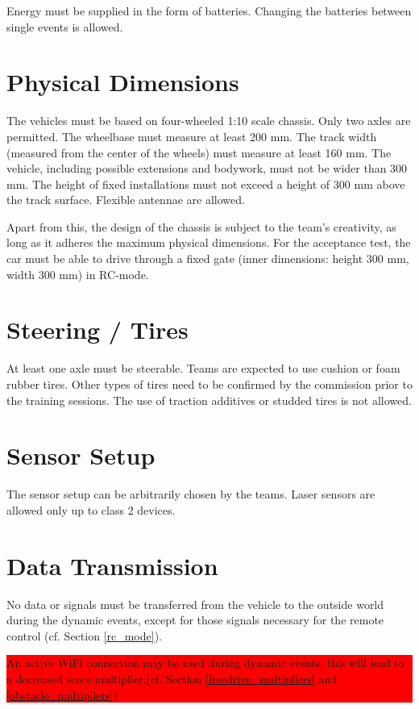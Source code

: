 \documentclass[a4paper]{report}
\newlength\colorboxwidth
\begin{document}
Energy must be supplied in the form of batteries. Changing the batteries between single events is allowed. 

\section{Physical Dimensions}

The vehicles must be based on four-wheeled 1:10 scale chassis. Only two axles are permitted. The wheelbase must measure at least 200 mm. The track width (measured from the center of the wheels) must measure at least 160 mm. The vehicle, including possible extensions and bodywork, must not be wider than 300 mm. The height of fixed installations must not exceed a height of 300 mm above the track surface. Flexible antennae are allowed.

Apart from this, the design of the chassis is subject to the team’s creativity, as long as it adheres the maximum physical dimensions. For the acceptance test, the car must be able to drive through a fixed gate (inner dimensions: height 300 mm, width 300 mm) in RC-mode. 

\section{Steering / Tires}

At least one axle must be steerable. Teams are expected to use cushion or foam rubber tires. Other types of tires need to be confirmed by the commission prior to the training sessions. The use of traction additives or studded tires is not allowed. 

\section{Sensor Setup}

The sensor setup can be arbitrarily chosen by the teams. Laser sensors are allowed only up to class 2 devices. 

\section{Data Transmission}

No data or signals must be transferred from the vehicle to the outside world during the dynamic events, except for those signals necessary for the remote control (cf. Section \ref{rc_mode}).\\
\colorbox{red}{\parbox{\colorboxwidth}{An active WiFi connection may be used during dynamic events, this will lead to a decreased score multiplier.(cf. Section \ref{freedrive_multipliers} and \ref{obstacle_multipliers})}}
\end{document}
